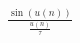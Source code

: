 \documentclass[preview]{standalone}
\begin{document}
\begin{align*}
\frac {\sin \left(u(n)\right)} {\frac {u(n)}{\tau} }
\end{align*}
\end{document}
